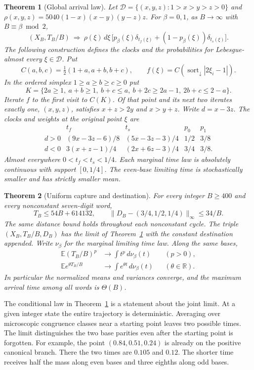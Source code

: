 \documentclass[11pt,reqno]{amsart}
\newtheorem{theorem}{Theorem}
\newcommand{\D}{\mathcal D}
\newcommand{\R}{\mathbb R}
\newcommand{\ord}{\operatorname{sort}_{\downarrow}}
\newcommand{\E}{\mathbb E}
\begin{document}
\begin{theorem}[Global arrival law]\label{th:law}
Let $\D=\{(x,y,z):1>x>y>z>0\}$ and
$\rho(x,y,z)=5040(1-x)(x-y)(y-z)z$.
For $\beta=0,1$, as $B\to\infty$ with $B\equiv\beta\bmod 2$,
\[
 (X_B,T_B/B)\ \Longrightarrow\
 \rho(\xi)\,d\xi\,\bigl[p_\beta(\xi)\delta_{t_f(\xi)}
                    +(1-p_\beta(\xi))\delta_{t_s(\xi)}\bigr].
\]
The following construction defines the clocks and the probabilities for
Lebesgue-almost every $\xi\in\D$. Put
\[
 C(a,b,c)=\tfrac12(1+a,a+b,b+c),\qquad f(\xi)=C(\ord |2\xi_i-1|).
\]
In the ordered simplex $1\ge a\ge b\ge c\ge0$ put
\[
 K=\{2a\ge1,\ a+b\ge1,\ b+c\le a,\ b+2c\ge2a-1,\ 2b+c\le2-a\}.
\]
Iterate $f$ to the first visit to $C(K)$. Of that point and its next
two iterates exactly one, $(x,y,z)$, satisfies $x+z>2y$ and $x>y+z$.
Write $d=x-3z$. The clocks and weights at the original point $\xi$ are
\[
\begin{array}{c|cc|cc}
 &t_f&t_s&p_0&p_1\\ \hline
 d>0 &(9x-3z-6)/8&(5x-3z-3)/4&1/2&3/8\\
 d<0 &3(x+z-1)/4&(2x+6z-3)/4&3/4&3/8 .
\end{array}
\]
Almost everywhere $0<t_f<t_s<1/4$. Each marginal time law is absolutely
continuous with support $[0,1/4]$. The even-base limiting time is
stochastically smaller and has strictly smaller mean.
\end{theorem}

\begin{theorem}[Uniform capture and destination]\label{th:clock}
For every integer $B\ge400$ and every nonconstant seven-digit word,
\[
 T_B\le54B+614132,\qquad
 \|D_B-(3/4,1/2,1/4)\|_\infty\le 34/B .
\]
The same distance bound holds throughout each nonconstant cycle. The triple $(X_B,T_B/B,D_B)$ has the limit of Theorem~\ref{th:law}
with the constant destination appended. Write $\nu_\beta$ for the marginal
limiting time law. Along the same bases,
\[
 \begin{aligned}
 \E (T_B/B)^p&\longrightarrow\int t^p\,d\nu_\beta(t) &&(p>0),\\
 \E e^{\theta T_B/B}&\longrightarrow\int e^{\theta t}\,d\nu_\beta(t) &&(\theta\in\R).
 \end{aligned}
\]
In particular the normalized means and variances converge, and the
maximum arrival time among all words is $\Theta(B)$.
\end{theorem}

The conditional law in Theorem~\ref{th:law} is a statement about the joint
limit. At a given integer state the entire trajectory is deterministic.
Averaging over microscopic congruence classes near a starting point leaves
two possible times. The limit distinguishes the two base parities even after
the starting point is forgotten. For example, the point
$(0.84,0.51,0.24)$ is already on the positive canonical branch. There
the two times are $0.105$ and $0.12$. The shorter time receives half the
mass along even bases and three eighths along odd bases.
\end{document}
